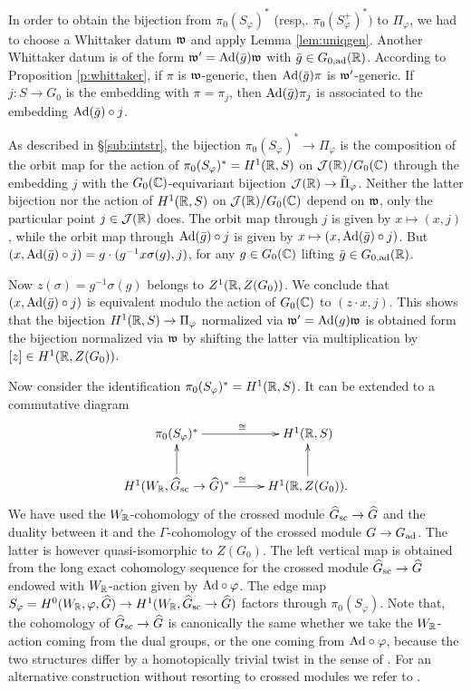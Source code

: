 \documentclass{article}
\theoremstyle{definition}
\numberwithin{equation}{section}
\renewcommand{\-}{\hyp{}}
\begin{document}
In order to obtain the bijection from $\pi_0(S_\varphi)^*$ (resp,. $\pi_0(S_\varphi^+)^*)$ to $\Pi_\varphi$, we had to choose a Whittaker datum $\mathfrak{w}$ and apply Lemma \ref{lem:uniqgen}. Another Whittaker datum is of the form $\mathfrak{w'}=\textrm{Ad}(\bar g)\mathfrak{w}$ with $\bar g \in G_{0,\textrm{ad}}(\mathbb{R})$. According to Proposition \ref{p:whittaker}, if $\pi$ is $\mathfrak{w}$-generic, then $\textrm{Ad}(\bar g)\pi$ is $\mathfrak{w'}$-generic. If $j : S \to G_0$ is the embedding with $\pi=\pi_j$, then $\textrm{Ad}(\bar g)\pi_j$ is associated to the embedding $\textrm{Ad}(\bar g)\circ j$.

As described in \S\ref{sub:intstr}, the bijection $\pi_0(S_\varphi)^* \to \Pi_\varphi$ is the composition of the orbit map for the action of $\pi_0(S_\varphi)^*=H^1(\mathbb{R},S)$ on $\mathcal{J}(\mathbb{R})/G_0(\mathbb{C})$ through the embedding $j$ with the $G_0(\mathbb{C})$-equivariant bijection $\mathcal{J}(\mathbb{R}) \to \tilde\Pi_\varphi$. Neither the latter bijection nor the action of $H^1(\mathbb{R},S)$ on $\mathcal{J}(\mathbb{R})/G_0(\mathbb{C})$ depend on $\mathfrak{w}$, only the particular point $j \in \mathcal{J}(\mathbb{R})$ does. The orbit map through $j$ is given by $x \mapsto (x,j)$, while the orbit map through $\textrm{Ad}(\bar g)\circ j$ is given by $x \mapsto (x,\textrm{Ad}(\bar g)\circ j)$. But $(x,\textrm{Ad}(\bar g)\circ j)=g\cdot (g^{-1}x\sigma(g),j)$, for any $g \in G_0(\mathbb{C})$ lifting $\bar g \in G_{0,\textrm{ad}}(\mathbb{R})$.

Now $z(\sigma)=g^{-1}\sigma(g)$ belongs to $Z^1(\mathbb{R},Z(G_0))$. We conclude that $(x,\textrm{Ad}(\bar g)\circ j)$ is equivalent modulo the action of $G_0(\mathbb{C})$ to $(z\cdot x,j)$. This shows that the bijection $H^1(\mathbb{R},S) \to \Pi_\varphi$ normalized via $\mathfrak{w'}=\textrm{Ad}(g)\mathfrak{w}$ is obtained form the bijection normalized via $\mathfrak{w}$ by shifting the latter via multiplication by $[z] \in H^1(\mathbb{R},Z(G_0))$. 

Now consider the identification $\pi_0(S_\varphi)^* = H^1(\mathbb{R},S)$. It can be extended to a commutative diagram
\[ \xymatrix{
	\pi_0(S_\varphi)^*\ar[r]^\cong&H^1(\R,S)\\
	H^1(W_\R,\hat G_\tx{sc} \to \hat G)^*\ar[u]\ar[r]^\cong&H^1(\R,Z(G_0)).\ar[u]
}
\]
We have used  the $W_{\mathbb{R}}$-cohomology of the crossed module $\widehat G_{\textrm{sc}} \to \widehat G$ and the duality between it and the $\Gamma$-cohomology of the crossed module $G \to G_{\textrm{ad}}$. The latter is however quasi-isomorphic to $Z(G_0)$. The left vertical map is obtained from the long exact cohomology sequence for the crossed module $\widehat G_{\textrm{sc}} \to \widehat G$ endowed with $W_{\mathbb{R}}$-action given by $\textrm{Ad}\circ\varphi$. The edge map $S_\varphi=H^0(W_{\mathbb{R}},\varphi,\widehat G) \to H^1(W_{\mathbb{R}},\widehat G_{\textrm{sc}} \to \widehat G)$ factors through $\pi_0(S_\varphi)$. Note that, the cohomology of $\widehat G_{\textrm{sc}} \to \widehat G$ is canonically the same whether we take the $W_{\mathbb{R}}$-action coming from the dual groups, or the one coming from $\textrm{Ad}\circ\varphi$, because the two structures differ by a homotopically trivial twist in the sense of \cite[\S2.4]{KalECI}. For an alternative construction without resorting to crossed modules we refer to \cite[\S4]{KalGen}.
\end{document}
